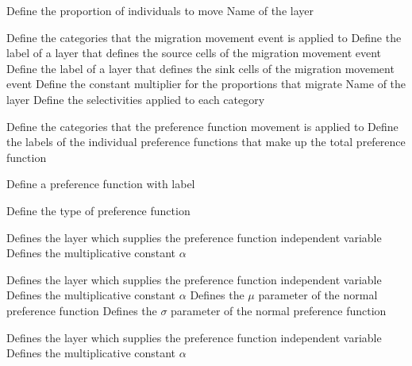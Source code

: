  {Define the proportion of individuals to move}
 {Name of the layer}
\par\textbf{}\par
{} {Define the categories that the migration movement event is applied to}
 {Define the label of a layer that defines the source cells of the migration movement event}
 {Define the label of a layer that defines the sink cells of the migration movement event}
 {Define the constant multiplier for the proportions that migrate}
 {Name of the layer}
 {Define the selectivities applied to each category}
\par\textbf{}\par
\par\textbf{}\par
{} {Define the categories that the preference function movement is applied to}
 {Define the labels of the individual  preference functions that make up the total preference function}
\par{} {Define a preference function with label}\par
{} {Define the type of preference function}
\par\textbf{}\par
{} {Defines the layer which supplies the preference function independent variable}
 {Defines the multiplicative constant $\alpha$}
\par\textbf{}\par
{} {Defines the layer which supplies the preference function independent variable}
 {Defines the multiplicative constant $\alpha$}
 {Defines the $\mu$ parameter of the normal preference function}
 {Defines the $\sigma$ parameter of the normal preference function}
\par\textbf{}\par
{} {Defines the layer which supplies the preference function independent variable}
 {Defines the multiplicative constant $\alpha$}
